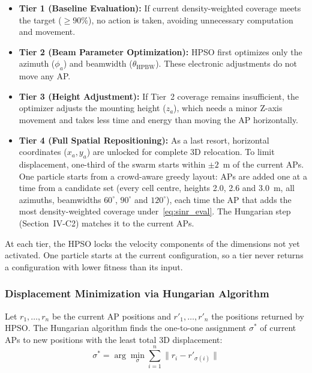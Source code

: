 \documentclass[conference]{IEEEtran}
\begin{document}
	\begin{itemize}
		\item \textbf{Tier 1 (Baseline Evaluation):} If current density-weighted
		coverage meets the target ($\ge 90\%$), no action is taken,
		avoiding unnecessary computation and movement.

		\item \textbf{Tier 2 (Beam Parameter Optimization):} HPSO first
		optimizes only the azimuth ($\phi_a$) and beamwidth ($\theta_{\text{HPBW}}$). These electronic adjustments do not move any AP.

		\item \textbf{Tier 3 (Height Adjustment):} If Tier~2 coverage
		remains insufficient, the optimizer adjusts the mounting height
		($z_a$), which needs a minor Z-axis movement and takes less time and energy than moving the AP horizontally.

		\item \textbf{Tier 4 (Full Spatial Repositioning):} As a last resort,
		horizontal coordinates ($x_a, y_a$) are unlocked for complete 3D relocation.
		To limit displacement, one-third of the swarm starts within $\pm 2$~m of the current APs. One particle starts from a crowd-aware greedy layout: APs are added one at a time from a candidate set (every cell centre, heights 2.0, 2.6 and 3.0~m, all azimuths, beamwidths $60^{\circ}$, $90^{\circ}$ and $120^{\circ}$), each time the AP that adds the most density-weighted coverage under~\eqref{eq:sinr_eval}. The Hungarian step (Section~IV-C2) matches it to the current APs.
	\end{itemize}

	At each tier, the HPSO locks the velocity components of the dimensions not yet activated. One particle starts at the current configuration, so a tier never returns a configuration with lower fitness than its input.

	\subsubsection{Displacement Minimization via Hungarian Algorithm}

	Let $r_1, \ldots, r_n$ be the current AP positions and $r'_1, \ldots, r'_n$ the positions returned by HPSO. The Hungarian algorithm \cite{b12} finds the one-to-one assignment $\sigma^*$ of current APs to new positions with the least total 3D displacement:
	\begin{equation}
		\sigma^* = \arg\min_{\sigma} \sum_{i=1}^{n} \|r_i - r'_{\sigma(i)}\|
		\label{eq:hungarian}
	\end{equation}
\end{document}
